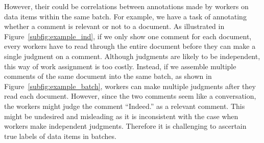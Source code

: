 However, their could be correlations between annotations made by workers on data items within the same batch.  
For example, we have a task of annotating whether a comment is relevant or not to a document.  
As illustrated in Figure~\ref{subfig:example_ind}, if we only show one comment for each document, 
every workers have to read through the entire document before they can make a single judgment on a comment.  
Although judgments are likely to be independent, this way of work assignment is too costly.  
Instead, if we assemble multiple comments of the same document into the same batch, as shown in Figure~\ref{subfig:example_batch}, 
workers can make multiple judgments after they read each document.  
However, since the two comments seem like a conversation, 
the workers might judge the comment ``Indeed.'' as a relevant comment.  
This might be undesired and misleading as it is inconsistent with the case when workers make independent judgments.  
Therefore it is challenging to ascertain true labels of data items in batches.  





